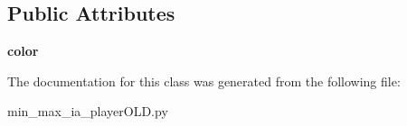 \subsection*{Public Attributes}
\begin{DoxyCompactItemize}
\item 
\hypertarget{class_tabuleiro_othello-fork_1_1models_1_1players_1_1min__max__ia__player_o_l_d_1_1_minmax_player_a1e1c63610e0a026a8c6190514c04f2ca}{}{\bfseries color}\label{class_tabuleiro_othello-fork_1_1models_1_1players_1_1min__max__ia__player_o_l_d_1_1_minmax_player_a1e1c63610e0a026a8c6190514c04f2ca}

\end{DoxyCompactItemize}


The documentation for this class was generated from the following file\+:\begin{DoxyCompactItemize}
\item 
min\+\_\+max\+\_\+ia\+\_\+player\+O\+L\+D.\+py\end{DoxyCompactItemize}
